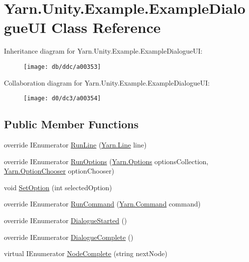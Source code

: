 \hypertarget{a00039}{\section{Yarn.\-Unity.\-Example.\-Example\-Dialogue\-U\-I Class Reference}
\label{a00039}
}


Inheritance diagram for Yarn.\-Unity.\-Example.\-Example\-Dialogue\-U\-I\-:
\nopagebreak
\begin{figure}[H]
\begin{center}
\leavevmode
\texttt{[image: db/ddc/a00353]}
\end{center}
\end{figure}


Collaboration diagram for Yarn.\-Unity.\-Example.\-Example\-Dialogue\-U\-I\-:
\nopagebreak
\begin{figure}[H]
\begin{center}
\leavevmode
\texttt{[image: d0/dc3/a00354]}
\end{center}
\end{figure}
\subsection*{Public Member Functions}
\begin{DoxyCompactItemize}
\item 
override I\-Enumerator \hyperlink{a00039_a109aeedc5206dcbc4f629638b7830030}{Run\-Line} (\hyperlink{a00026_d6/d7d/a00161}{Yarn.\-Line} line)
\item 
override I\-Enumerator \hyperlink{a00039_aaa93672700a456e66c694636460a58f4}{Run\-Options} (\hyperlink{a00026_dd/dae/a00163}{Yarn.\-Options} options\-Collection, \hyperlink{a00026_a39866cbb03c03a35805d598b5d4ad553}{Yarn.\-Option\-Chooser} option\-Chooser)
\item 
void \hyperlink{a00039_ad1ac5781ded20d2950d8dd3af506df37}{Set\-Option} (int selected\-Option)
\item 
override I\-Enumerator \hyperlink{a00039_a7f84b1e7d3c9c1f7507d143e11ba8075}{Run\-Command} (\hyperlink{a00026_d6/db8/a00158}{Yarn.\-Command} command)
\item 
override I\-Enumerator \hyperlink{a00039_a313283f6c53354b54f25898eb436eba0}{Dialogue\-Started} ()
\item 
override I\-Enumerator \hyperlink{a00039_a1f2a08baacc25aea09af8e60eb5d3eb1}{Dialogue\-Complete} ()
\item 
virtual I\-Enumerator \hyperlink{a00038_a2900548a0704d39d4502a153945f4bef}{Node\-Complete} (string next\-Node)
\end{DoxyCompactItemize}
